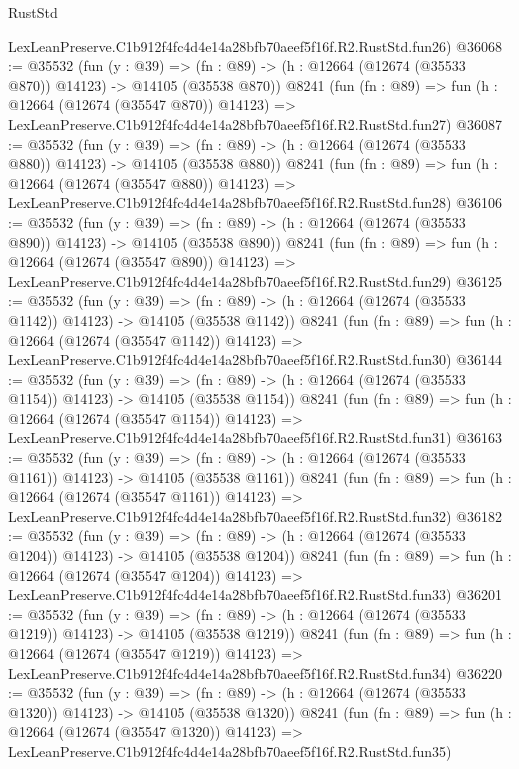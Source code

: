 \begin{lexlean}{RustStd}
\begin{coremodule}
    LexLeanPreserve.C1b912f4fc4d4e14a28bfb70aeef5f16f.R2.RustStd.fun26)
@36068 := @35532
    (fun (y : @39) =>
    (fn : @89) -> (h : @12664 (@12674 (@35533 @870)) @14123) -> @14105 (@35538 @870))
    @8241
    (fun (fn : @89) =>
    fun (h : @12664 (@12674 (@35547 @870)) @14123) =>
    LexLeanPreserve.C1b912f4fc4d4e14a28bfb70aeef5f16f.R2.RustStd.fun27)
@36087 := @35532
    (fun (y : @39) =>
    (fn : @89) -> (h : @12664 (@12674 (@35533 @880)) @14123) -> @14105 (@35538 @880))
    @8241
    (fun (fn : @89) =>
    fun (h : @12664 (@12674 (@35547 @880)) @14123) =>
    LexLeanPreserve.C1b912f4fc4d4e14a28bfb70aeef5f16f.R2.RustStd.fun28)
@36106 := @35532
    (fun (y : @39) =>
    (fn : @89) -> (h : @12664 (@12674 (@35533 @890)) @14123) -> @14105 (@35538 @890))
    @8241
    (fun (fn : @89) =>
    fun (h : @12664 (@12674 (@35547 @890)) @14123) =>
    LexLeanPreserve.C1b912f4fc4d4e14a28bfb70aeef5f16f.R2.RustStd.fun29)
@36125 := @35532
    (fun (y : @39) =>
    (fn : @89) -> (h : @12664 (@12674 (@35533 @1142)) @14123) -> @14105 (@35538 @1142))
    @8241
    (fun (fn : @89) =>
    fun (h : @12664 (@12674 (@35547 @1142)) @14123) =>
    LexLeanPreserve.C1b912f4fc4d4e14a28bfb70aeef5f16f.R2.RustStd.fun30)
@36144 := @35532
    (fun (y : @39) =>
    (fn : @89) -> (h : @12664 (@12674 (@35533 @1154)) @14123) -> @14105 (@35538 @1154))
    @8241
    (fun (fn : @89) =>
    fun (h : @12664 (@12674 (@35547 @1154)) @14123) =>
    LexLeanPreserve.C1b912f4fc4d4e14a28bfb70aeef5f16f.R2.RustStd.fun31)
@36163 := @35532
    (fun (y : @39) =>
    (fn : @89) -> (h : @12664 (@12674 (@35533 @1161)) @14123) -> @14105 (@35538 @1161))
    @8241
    (fun (fn : @89) =>
    fun (h : @12664 (@12674 (@35547 @1161)) @14123) =>
    LexLeanPreserve.C1b912f4fc4d4e14a28bfb70aeef5f16f.R2.RustStd.fun32)
@36182 := @35532
    (fun (y : @39) =>
    (fn : @89) -> (h : @12664 (@12674 (@35533 @1204)) @14123) -> @14105 (@35538 @1204))
    @8241
    (fun (fn : @89) =>
    fun (h : @12664 (@12674 (@35547 @1204)) @14123) =>
    LexLeanPreserve.C1b912f4fc4d4e14a28bfb70aeef5f16f.R2.RustStd.fun33)
@36201 := @35532
    (fun (y : @39) =>
    (fn : @89) -> (h : @12664 (@12674 (@35533 @1219)) @14123) -> @14105 (@35538 @1219))
    @8241
    (fun (fn : @89) =>
    fun (h : @12664 (@12674 (@35547 @1219)) @14123) =>
    LexLeanPreserve.C1b912f4fc4d4e14a28bfb70aeef5f16f.R2.RustStd.fun34)
@36220 := @35532
    (fun (y : @39) =>
    (fn : @89) -> (h : @12664 (@12674 (@35533 @1320)) @14123) -> @14105 (@35538 @1320))
    @8241
    (fun (fn : @89) =>
    fun (h : @12664 (@12674 (@35547 @1320)) @14123) =>
    LexLeanPreserve.C1b912f4fc4d4e14a28bfb70aeef5f16f.R2.RustStd.fun35)

\end{coremodule}
\end{lexlean}
